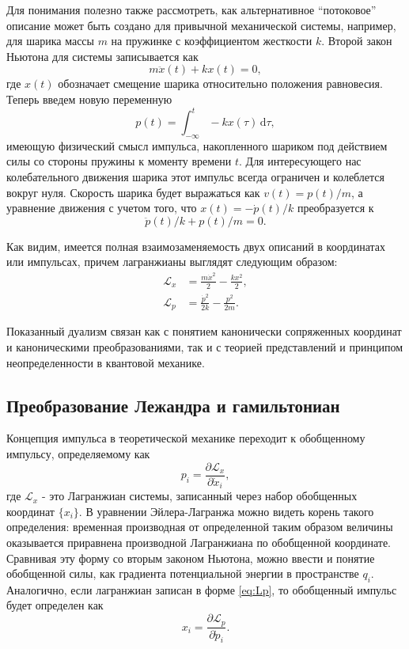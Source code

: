 \documentclass[14pt, a4paper]{extreport}
\newcommand{\diff}{\,\mathrm{d}}
\numberwithin{equation}{section}
\begin{document}
Для понимания полезно также рассмотреть, как альтернативное ``потоковое'' описание может быть создано для привычной механической системы, например, для шарика массы $m$ на пружинке с коэффициентом жесткости $k$. Второй закон Ньютона для системы записывается как
\begin{equation}
	m \ddot x(t) + k x(t) = 0,
\end{equation}
где $x(t)$ обозначает смещение шарика относительно положения равновесия. Теперь введем новую переменную
\begin{equation}
	p(t) = \int_{-\infty}^{t} - k x(\tau) \diff \tau,
\end{equation}
имеющую физический смысл импульса, накопленного шариком под действием силы со стороны пружины к моменту времени $ t $. Для интересующего нас колебательного движения шарика этот импульс всегда ограничен и колеблется вокруг нуля. Скорость шарика будет выражаться как $v(t) = p(t)/m$, а уравнение движения с учетом того, что $ x(t) = - \dot p(t) / k $ преобразуется к 
\begin{equation}
	\ddot p(t)/k + p(t)/m = 0.
\end{equation}

Как видим, имеется полная взаимозаменяемость двух описаний в координатах или импульсах, причем лагранжианы выглядят следующим образом:
\begin{align}
\mathcal{L}_x &= \frac{m \dot x^2}{2} - \frac{k x^2}{2},\\
\mathcal{L}_p &= \frac{\dot p^2}{2 k} - \frac{p^2}{2 m}.\label{eq:Lp}
\end{align}

Показанный дуализм связан как с понятием канонически сопряженных координат и каноническими преобразованиями, так и с теорией представлений и принципом неопределенности в квантовой механике.

\subsection{Преобразование Лежандра и гамильтониан}

Концепция импульса в теоретической механике переходит к обобщенному импульсу, определяемому как 
\begin{equation}
	p_i = \frac{\partial \mathcal{L}_x}{\partial \dot x_i},
\end{equation}
где $ \mathcal{L}_x $ - это Лагранжиан системы, записанный через набор обобщенных координат $\{x_i\}$. В уравнении Эйлера-Лагранжа можно видеть корень такого определения: временная производная от определенной таким образом величины оказывается приравнена производной Лагранжиана по обобщенной координате. Сравнивая эту форму со вторым законом Ньютона, можно ввести и понятие обобщенной силы, как градиента потенциальной энергии в пространстве $q_i$. Аналогично, если лагранжиан записан в форме \eqref{eq:Lp}, то обобщенный импульс будет определен как
\begin{equation}
x_i = \frac{\partial \mathcal{L}_p}{\partial \dot p_i}.
\end{equation}
\end{document}
